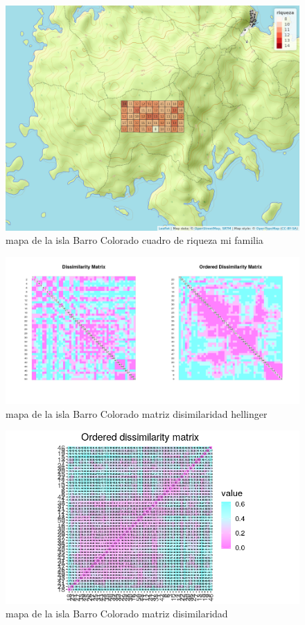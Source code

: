 \documentclass[11pt,]{article}
\begin{document}
\begin{figure}
\centering
\includegraphics[width=1.00000\textwidth]{mapa_cuadros_riq_mi_familia.png}
\caption{mapa de la isla Barro Colorado cuadro de riqueza mi familia
\label{fig:bci_map}}
\end{figure}

\begin{figure}
\centering
\includegraphics[width=1.00000\textwidth]{matriz_disimilaridad_hellinger.png}
\caption{mapa de la isla Barro Colorado matriz disimilaridad hellinger
\label{fig:bci_map}}
\end{figure}

\begin{figure}
\centering
\includegraphics[width=1.00000\textwidth]{matrizdedisimilaridad.png}
\caption{mapa de la isla Barro Colorado matriz disimilaridad
\label{fig:bci_map}}
\end{figure}
\end{document}
